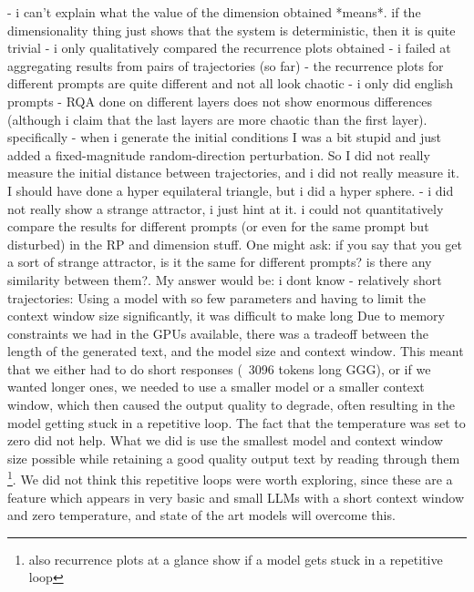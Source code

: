 \documentclass[a4paper,12pt]{article}
\begin{document}
- i can't explain what the value of the dimension obtained *means*. if the dimensionality thing just shows that the system is deterministic, then it is quite trivial
- i only qualitatively compared the recurrence plots obtained
- i failed at aggregating results from pairs of trajectories (so far)
- the recurrence plots for different prompts are quite different and not all look chaotic
- i only did english prompts
- RQA done on different layers does not show enormous differences (although i claim that the last layers are more chaotic than the first layer). specifically
- when i generate the initial conditions I was a bit stupid and just added a fixed-magnitude random-direction perturbation. So I did not really measure the initial distance between trajectories, and i did not really measure it. I should have done a hyper equilateral triangle, but i did a hyper sphere.
- i did not really show a strange attractor, i just hint at it. i could not quantitatively compare the results for different prompts (or even for the same prompt but disturbed) in the RP and dimension stuff. One might ask: if you say that you get a sort of strange attractor, is it the same for different prompts? is there any similarity between them?. My answer would be: i dont know
- relatively short trajectories:
Using a model with so few parameters and having to limit the context window size significantly, it was difficult to make long
Due to memory constraints we had in the GPUs available, there was a tradeoff between the length of the generated text, and the model size and context window. This meant that we either had to do short responses (~3096 tokens long GGG), or if we wanted longer ones, we needed to use a smaller model or a smaller context window, which then caused the output quality to degrade, often resulting in the model getting stuck in a repetitive loop. The fact that the temperature was set to zero did not help.
What we did is use the smallest model and context window size possible while retaining a good quality output text by reading through them \footnote{also recurrence plots at a glance show if a model gets stuck in a repetitive loop}. 
We did not think this repetitive loops were worth exploring, since these are a feature which appears in very basic and small LLMs with a short context window and zero temperature, and state of the art models will overcome this.
\end{document}
